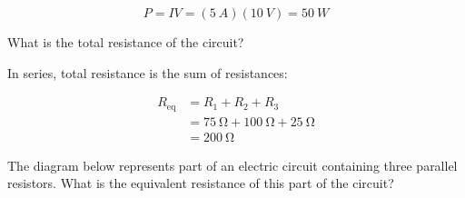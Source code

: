 \documentclass[answers]{exam}
\begin{document}
\begin{questions}
\begin{solutionorbox}[2.5cm]
\begin{equation*}
    P = IV = (\SI{5}{A})(\SI{10}{V}) = \boxed{\SI{50}{W}} 
\end{equation*}
\end{solutionorbox}


\question
What is the total resistance of the circuit?

\begin{center}
\end{center}

\begin{solutionorbox}[2.0cm]
In series, total resistance is the sum of resistances:

\begin{align*}
    R_\mathrm{eq} &= R_1 + R_2 + R_3 \\[1ex]
    &= \SI{75}{\ohm} + \SI{100}{\ohm} + \SI{25}{\ohm} \\[1ex]
    &= \boxed{\SI{200}{\ohm}}
\end{align*}
\end{solutionorbox}


\question
The diagram below represents part of an electric circuit containing three parallel resistors. What is the equivalent resistance of this part of the circuit?

\begin{minipage}{6cm}
\centering
{}
\end{minipage}%
\fbox{
\begin{minipage}{9cm}
\ifprintanswers
\color{red}
\else
\color{white}
\fi


\end{minipage}}
\end{questions}
\end{document}

